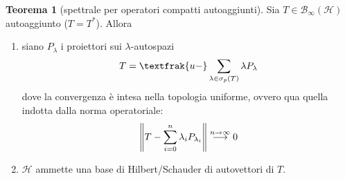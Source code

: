 \documentclass[a4paper,10pt]{article}
\theoremstyle{definition}
\newcommand{\hil}{\mathcal{H}} %
\theoremstyle{indentdefinition}
\theoremstyle{indenttheorem}
\newtheorem{thm}{Teorema}
\theoremstyle{myremark}
\theoremstyle{indentgeneral}
\newenvironment{myboxed} 
{\noindent\begin{lrbox}{\mybox}\begin{minipage}{\textwidth}}
{\end{minipage}\end{lrbox}\fbox{\usebox{\mybox}}}
\begin{document}
\begin{myboxed}
    \begin{thm}[spettrale per operatori compatti autoaggiunti]
        Sia $T\in\mathcal{B}_\infty(\hil)$ autoaggiunto ($T=T^*$). Allora
        \begin{enumerate}
            \item siano $P_\lambda$ i proiettori sui $\lambda$-autospazi
            $$T=\textfrak{u-}\sum_{\lambda\in\sigma_p(T)}\lambda P_\lambda$$
            dove la convergenza è intesa nella topologia uniforme, ovvero qua quella indotta dalla norma operatoriale:
            $$\norm{T-\sum_{i=0}^n\lambda_iP_{\lambda_i}}\overset{n\to\infty}{\longrightarrow}0$$
            \item $\hil$ ammette una base di Hilbert/Schauder di autovettori di $T$.
        \end{enumerate}
    \end{thm}
\end{myboxed}
\end{document}
